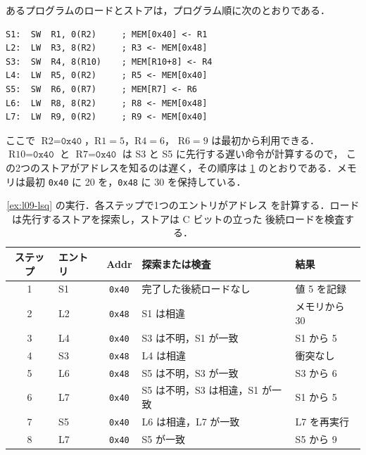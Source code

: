 \documentclass[../main.tex]{subfiles}
\begin{document}
\begin{example}
  \label{ex:l09-lsq}
  あるプログラムのロードとストアは，プログラム順に次のとおりである．
  \begin{lstlisting}[language={[x86masm]Assembler}, numbers=none]
S1:  SW  R1, 0(R2)     ; MEM[0x40] <- R1
L2:  LW  R3, 8(R2)     ; R3 <- MEM[0x48]
S3:  SW  R4, 8(R10)    ; MEM[R10+8] <- R4
L4:  LW  R5, 0(R2)     ; R5 <- MEM[0x40]
S5:  SW  R6, 0(R7)     ; MEM[R7] <- R6
L6:  LW  R8, 8(R2)     ; R8 <- MEM[0x48]
L7:  LW  R9, 0(R2)     ; R9 <- MEM[0x40]
\end{lstlisting}
  ここで $\text{R2} = \texttt{0x40}$，$\text{R1}=5$，$\text{R4}=6$，
  $\text{R6}=9$ は最初から利用できる．$\text{R10} = \texttt{0x40}$ と
  $\text{R7}=\texttt{0x40}$ は S3 と S5 に先行する遅い命令が計算するので，
  この2つのストアがアドレスを知るのは遅く，その順序は
  \cref{tab:l09-trace} のとおりである．メモリは最初 \texttt{0x40} に 20
  を，\texttt{0x48} に 30 を保持している．
\end{example}

\begin{table}[htbp]
  \centering\small
  \caption{\cref{ex:l09-lsq} の実行．各ステップで1つのエントリがアドレス
    を計算する．ロードは先行するストアを探索し，ストアは C ビットの立った
    後続ロードを検査する．}
  \label{tab:l09-trace}
  \begin{tabular}{@{}clcll@{}}
    \toprule
    ステップ & エントリ & Addr & 探索または検査 & 結果 \\
    \midrule
    1 & S1 & \texttt{0x40} & 完了した後続ロードなし & 値 5 を記録 \\
    2 & L2 & \texttt{0x48} & S1 は相違 & メモリから 30 \\
    3 & L4 & \texttt{0x40} & S3 は不明，S1 が一致 & S1 から 5 \\
    4 & S3 & \texttt{0x48} & L4 は相違 & 衝突なし \\
    5 & L6 & \texttt{0x48} & S5 は不明，S3 が一致 & S3 から 6 \\
    6 & L7 & \texttt{0x40} & S5 は不明，S3 は相違，S1 が一致 & S1 から 5 \\
    7 & S5 & \texttt{0x40} & L6 は相違，L7 が一致 & L7 を再実行 \\
    8 & L7 & \texttt{0x40} & S5 が一致 & S5 から 9 \\
    \bottomrule
  \end{tabular}
\end{table}
\end{document}
